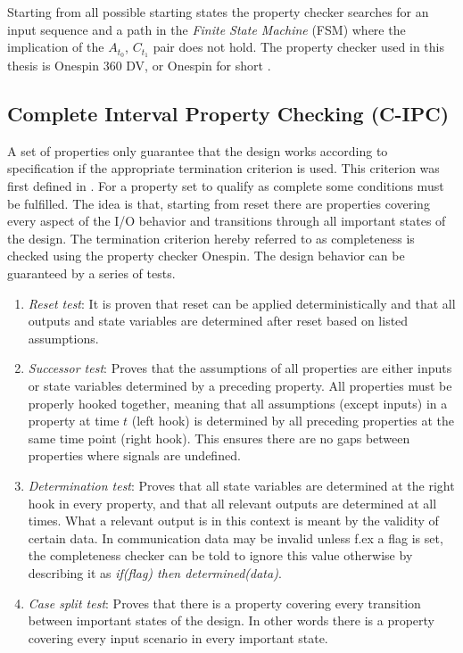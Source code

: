 Starting from all possible starting states the property checker searches for an input sequence and a path in the \textit{Finite State Machine} (FSM) where the implication of the $A_{t_0}$, $C_{t_1}$ pair does not hold. The property checker used in this thesis is Onespin 360 DV, or Onespin for short \cite{onespin}. 

\subsection{Complete Interval Property Checking (C-IPC)}
\label{sub:cipc}
A set of properties only guarantee that the design works according to specification if the appropriate termination criterion is used. This criterion was first defined in \cite{bormannbusch}. For a property set to qualify as complete some conditions must be fulfilled. The idea is that, starting from reset there are properties covering every aspect of the I/O behavior and transitions through all important states of the design. The termination criterion hereby referred to as completeness is checked using the property checker Onespin. The design behavior can be guaranteed by a series of tests.
\begin{enumerate}
 \item \textit{Reset test}: It is proven that reset can be applied deterministically and that all outputs and state variables are determined after reset based on listed assumptions.
 \item \textit{Successor test}: Proves that the assumptions of all properties are either inputs or state variables determined by a preceding property. All properties must be properly hooked together, meaning that all assumptions (except inputs) in a property at time $t$ (left hook) is determined by all preceding properties at the same time point (right hook). This ensures there are no gaps between properties where signals are undefined. 
 \item \textit{Determination test}: Proves that all state variables are determined at the right hook in every property, and that all relevant outputs are determined at all times. What a relevant output is in this context is meant by the validity of certain data. In communication data may be invalid unless f.ex a flag is set, the completeness checker can be told to ignore this value otherwise by describing it as \textit{if(flag) then determined(data)}.
 \item \textit{Case split test}: Proves that there is a property covering every transition between important states of the design. In other words there is a property covering every input scenario in every important state. 
\end{enumerate}

